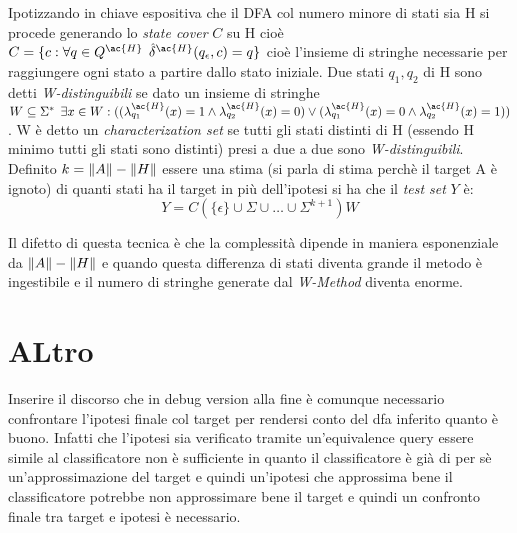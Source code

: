 Ipotizzando in chiave espositiva che il \ac{DFA} col numero minore di stati sia \ac{H} si procede generando lo \textit{state cover} $C$ su \ac{H} cioè  $C =\{c : \forall q \in Q^{\ac{H}} \:\: \hat{\delta}^{\ac{H}}(q_\epsilon,c)=q\}$ cioè l'insieme di stringhe necessarie per raggiungere ogni stato a partire dallo stato iniziale. Due stati $q_1,q_2$ di \ac{H} sono detti \textit{W-distinguibili} se dato un insieme di stringhe $W \subseteq \Sigma^{*}  \: \:\exists x \in W : ( ( \lambda^{\ac{H}}_{q_{1}}(x) = 1 \land \lambda^{\ac{H}}_{q_{2}}(x) = 0) \lor ( \lambda^{\ac{H}}_{q_{1}}(x) = 0 \land \lambda^{\ac{H}}_{q_{2}}(x) = 1) )$ . W è detto un \textit{characterization set} se tutti gli stati distinti di \ac{H} (essendo \ac{H} minimo tutti gli stati sono distinti) presi a due a due  sono \textit{W-distinguibili}. Definito $k = \lVert A\rVert - \lVert H\rVert$ essere una stima (si parla di stima perchè il target A è ignoto) di quanti stati ha il target in più dell'ipotesi si ha che il \textit{test set} $Y$ è:
\begin{equation*}
Y = C(\{\epsilon\} \cup \Sigma \cup \dots \cup \Sigma^{k+1})W
\end{equation*}

Il difetto di questa tecnica è che la complessità dipende in maniera esponenziale \cite[p. 181]{Chow78} da  $\lVert A\rVert - \lVert H\rVert$ e quando questa differenza di stati diventa grande il metodo è ingestibile e il numero di stringhe generate dal \textit{W-Method} diventa enorme.




\section{ALtro}
Inserire il discorso che in debug version alla fine è comunque necessario confrontare l'ipotesi finale col target per rendersi conto del dfa inferito quanto è buono. Infatti che l'ipotesi sia verificato tramite un'equivalence query essere simile al classificatore non è sufficiente in quanto il classificatore è già di per sè un'approssimazione del target e quindi un'ipotesi che approssima bene il classificatore potrebbe non approssimare bene il target e quindi un confronto finale tra target e ipotesi è necessario. 




